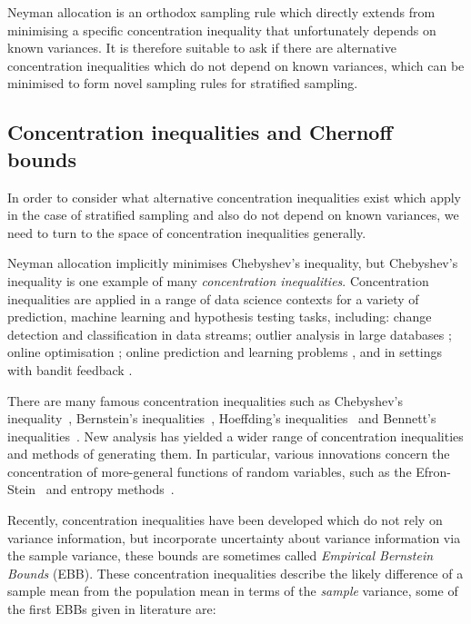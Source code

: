Neyman allocation is an orthodox sampling rule which directly extends from minimising a specific concentration inequality that unfortunately depends on known variances.
It is therefore suitable to ask if there are alternative concentration inequalities which do not depend on known variances, which can be minimised to form novel sampling rules for stratified sampling.




\subsection{Concentration inequalities and Chernoff bounds}

In order to consider what alternative concentration inequalities exist which apply in the case of stratified sampling and also do not depend on known variances, we need to turn to the space of concentration inequalities generally. 

Neyman allocation implicitly minimises Chebyshev's inequality, but Chebyshev's inequality is one example of many \textit{concentration inequalities}.
Concentration inequalities are applied in a range of data science contexts for a variety of prediction, machine learning and hypothesis testing tasks, including:
change detection \citep{KiferShaiGehrke2004,8000571} 
and classification \citep{Zia-UrRehman2012} in data streams;
outlier analysis in large databases \citep{Aggarwal2015};
online optimisation \citep{FlaxmanKalaiMcMahan2005,AgarwalDekelXiao2010}; 
online prediction and learning problems \citep{%
Mnih:2008:EBS:1390156.1390241,DBLP:conf/aaai/ThomasTG15,Maurer50empiricalbernstein},
and in settings with bandit feedback \citep{AuerCesa-BianchiEtal_SIAM2003,AudibertBubeck_COLT2009,Tran-ThanhChapmanRJ_AAAI2009}.

There are many famous concentration inequalities such as Chebyshev's inequality~\citep{Chebyshev1}, Bernstein's inequalities~\citep{Burnstein1}, 
Hoeffding's inequalities~\citep{hoeffding1} and Bennett's inequalities~\citep{10.2307/2282438}.
New analysis has yielded a wider range of concentration inequalities and methods of generating them.
In particular, various innovations concern the concentration of more-general functions of random variables, such as 
the Efron-Stein~\citep{efron1981} and 
entropy methods~\citep{Boucheron_concentrationinequalities}.%

Recently, concentration inequalities have been developed which do not rely on variance information, but incorporate uncertainty about variance information via the sample variance, these bounds are sometimes called \textit{Empirical Bernstein Bounds} (EBB).
These concentration inequalities describe the likely difference of a sample mean from the population mean in terms of the \textit{sample} variance, some of the first EBBs given in literature are:

